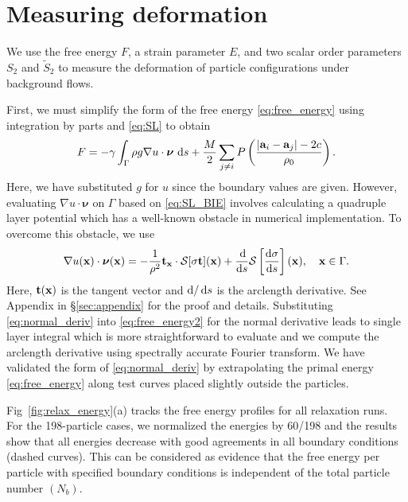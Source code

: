 \documentclass[prb,preprint,showpacs,preprintnumbers,amsmath,amssymb,longbibliography]{revtex4-1}
\renewcommand{\aa}{\mathbf{a}}
\newcommand{\DD}{\mathcal{D}}
\newcommand{\SSS}{\mathcal{S}}
\newcommand{\nnu}{\boldsymbol{\nu}}
\newcommand{\xx}{\mathbf{x}}
\begin{document}
\section{Measuring deformation}
We use the free energy $F$,
a strain parameter $E$, 
and two scalar order parameters $S_{2}$ and $\tilde S_2$ to measure
the deformation of particle configurations under background flows. 

First, we must simplify the
form of the free energy \eqref{eq:free_energy}
using integration by parts and \eqref{eq:SL}
to obtain
\begin{equation}
\label{eq:free_energy2}
F = -\gamma
\int_{\Gamma} \rho g \nabla u \cdot \nnu \,\dif s
+ \frac{M}{2}
\sum_{j \neq i} 
P\left(\frac{|\aa_i - \aa_j|-2c}{\rho_0}\right).
\end{equation}
%
Here, we have substituted $g$ for $u$ since the boundary values are given.
However, evaluating $\nabla u \cdot \nnu$ on $\Gamma$ based on \eqref{eq:SL_BIE}
involves calculating a quadruple layer potential which has a
well-known obstacle in numerical implementation.
To overcome this obstacle, we use
%
\begin{equation}
\label{eq:normal_deriv}
\nabla u(\xx) \cdot \nnu(\xx)=
-\frac{1}{\rho^2} {\bf t}_\xx\cdot \SSS[\sigma{\bf t}](\xx)
+ \frac{\dif}{\dif s}\SSS\left[\frac{\dif \sigma}{\dif s}\right](\xx), \quad \xx \in \Gamma.
\end{equation}
%
Here, ${\bf t}(\xx)$ is the tangent vector and $\dif/\dif s$ is the arclength derivative.
See Appendix in \S\ref{sec:appendix} for the proof and details.
Substituting \eqref{eq:normal_deriv} into \eqref{eq:free_energy2} for the normal derivative
leads to single layer integral which is more straightforward to evaluate and we compute the
arclength derivative using spectrally accurate Fourier transform.
We have validated the form of \eqref{eq:normal_deriv} by extrapolating 
the primal energy \eqref{eq:free_energy} along test curves placed slightly
outside the particles. 

Fig~\ref{fig:relax_energy}(a) tracks the free energy profiles for all relaxation runs.
For the 198-particle cases, we normalized the energies by 60/198 and the results
show that all energies decrease with good agreements in all boundary conditions (dashed curves).
This can be considered as evidence that the free energy per particle with specified
boundary conditions is independent of the total particle number $(N_b)$.
\end{document}
